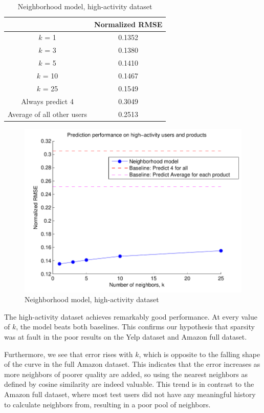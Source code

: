 \documentclass[letterpaper, 11 pt, conference]{ieeeconf}
\begin{document}
\begin{table}[htb]
\centering
\begin{tabular}{|c|c|}
\cline{2-2}

\multicolumn{1}{c|}{}  & {Normalized RMSE} \tabularnewline \hline
$k$ = 1 & 0.1352  \tabularnewline
$k$ = 3 & 0.1380 \tabularnewline
$k$ = 5 &  0.1410 \tabularnewline
$k$ = 10 &  0.1467 \tabularnewline
$k$ = 25  &  0.1549 \tabularnewline
\hline
Always predict 4 & 0.3049 \tabularnewline 
Average of all other users & 0.2513 \tabularnewline
\hline
\end{tabular}
\caption{Neighborhood model, high-activity dataset}
\label{table:modelone_subset}
\end{table}

\begin{figure}[h]
\includegraphics[scale=0.6]{images/modelone_subset.pdf}
\caption{Neighborhood model, high-activity dataset}
\label{fig:modelone_subset}
\end{figure}

The high-activity dataset achieves remarkably good performance. At every value 
of $k$, the model beats both baselines. This confirms our hypothesis that 
sparsity was at fault in the poor results on the Yelp dataset and Amazon full 
dataset.

Furthermore, we see that error rises with $k$, which is opposite to 
the falling shape of the curve in the full Amazon dataset. This indicates that 
the error increases as more neighbors of poorer quality are added, so using the 
nearest neighbors as defined by cosine similarity are indeed valuable. 
This trend is in contrast to the Amazon full dataset, 
where most test users did not have any meaningful history to calculate 
neighbors from, resulting in a poor pool of neighbors. 
\end{document}
